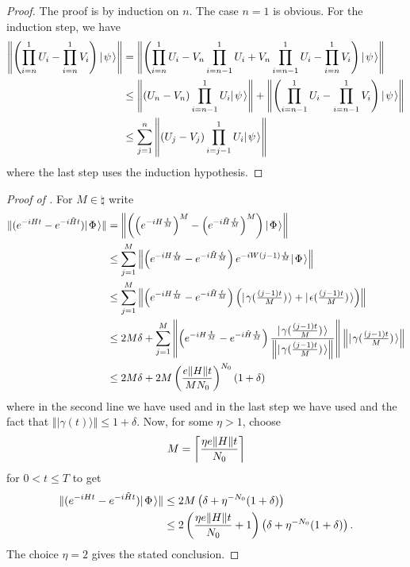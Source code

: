 \documentclass[../thesis-main/thesis-main]{subfiles}
\begin{document}
\begin{proof}
The proof is by induction on $n$.  The case $n=1$ is obvious.  For the induction step, we have \begin{align}   \left\|{\left(\prod_{i=n}^1 U_i - \prod_{i=n}^1 V_i \right) |\mspace{2mu} \psi \mspace{2mu} \rangle}\right\|   &= \left\|{\left(\prod_{i=n}^1 U_i - V_n \prod_{i=n-1}^1 U_i             + V_n \prod_{i=n-1}^1 U_i - \prod_{i=n}^1 V_i \right) |\mspace{2mu} \psi \mspace{2mu} \rangle}\right\| \\   &\le \left\|{(U_n - V_n) \prod_{i=n-1}^1 U_i |\mspace{2mu} \psi \mspace{2mu} \rangle}\right\|       +\left\|{\left(\prod_{i=n-1}^1 U_i - \prod_{i=n-1}^1 V_i \right) |\mspace{2mu} \psi \mspace{2mu} \rangle}\right\| \\   &\le \sum_{j=1}^n \left\|{(U_j - V_j)\prod_{i=j-1}^1 U_i |\mspace{2mu} \psi \mspace{2mu} \rangle}\right\| \end{align} where the last step uses the induction hypothesis. 
\end{proof}

\begin{proof}[Proof of {}]
For $M \in \natural$ write
\begin{align*}
  \|{(e^{-iHt}-e^{-i\tilde{H}t}) |\mspace{2mu} \Phi \mspace{2mu} \rangle}\|
  &= \left\|{\left(\left(e^{-iH\frac{t}{M}}\right)^{M} -
     \left(e^{-i\tilde{H}\frac{t}{M}}\right)^{M}\right) |\mspace{2mu} \Phi \mspace{2mu} \rangle}\right\| \\
  & \leq \sum_{j=1}^{M} \left\|{\left(e^{-iH\frac{t}{M}} - 
     e^{-i\tilde{H}\frac{t}{M}}\right) e^{-iW\left(j-1\right)\frac{t}{M}}
     |\mspace{2mu} \Phi \mspace{2mu} \rangle}\right\| \\
  & \leq \sum_{j=1}^{M} 
    \left\|{\left(e^{-iH\frac{t}{M}} - e^{-i\tilde{H}\frac{t}{M}}\right)
    \left(|\mspace{2mu} \gamma(\tfrac{(j-1)t}{M}) \mspace{2mu} \rangle +
          |\mspace{2mu} \epsilon(\tfrac{(j-1)t}{M}) \mspace{2mu} \rangle\right)}\right\| \\
  & \leq 2M\delta+\sum_{j=1}^{M} 
    \left\|{ \left(e^{-iH\frac{t}{M}} - e^{-i\tilde{H}\frac{t}{M}}\right)
    \frac{|\mspace{2mu} \gamma(\tfrac{(j-1)t}{M}) \mspace{2mu} \rangle} 
         {\left\|{|\mspace{2mu} \gamma(\tfrac{(j-1)t}{M}) \mspace{2mu} \rangle}\right\|}}\right\|
    \left\|{|\mspace{2mu} \gamma(\tfrac{(j-1)t}{M}) \mspace{2mu} \rangle}\right\|\\ 
  & \leq 2M\delta 
    + 2M\left(\frac{e\|{H}\|t}{M N_0}\right)^{N_0}(1+\delta)
\end{align*}
where in the second line we have used  and in the last step we have used  and the fact that $\Vert |\gamma(t)\rangle\Vert \leq 1+\delta$.
Now, for some $\eta>1$, choose
\[
  M= \left\lceil \frac{\eta e\|{H}\|t}{N_0} \right\rceil
\]
for $0<t\leq T$ to get
\begin{align*}
  \|{(e^{-iHt}-e^{-i\tilde{H}t}) |\mspace{2mu} \Phi \mspace{2mu} \rangle}\|
  &\leq 2M\left(\delta + \eta^{-N_0}(1+\delta)\right) \\
  &\leq 2\left(\frac{\eta e\|{H}\|t}{N_0} + 1 \right) 
        \left(\delta + \eta^{-N_0}(1+\delta)\right).
\end{align*}
The choice $\eta=2$ gives the stated conclusion.
\end{proof}
\end{document}
